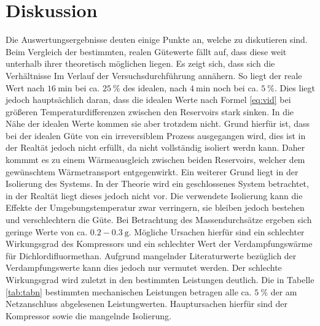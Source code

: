 
\section{Diskussion}
\label{sec:Diskussion}
Die Auswertungsergebnisse deuten einige Punkte an, welche zu diskutieren sind.
Beim Vergleich der bestimmten, realen Gütewerte fällt auf, dass diese weit
unterhalb ihrer theoretisch möglichen liegen. Es zeigt sich, dass sich die
Verhältnisse Im Verlauf der Versuchsdurchführung annähern. So liegt der reale
Wert nach $\SI{16}{\minute}$ bei ca. $\SI{25}{\percent}$ des idealen, nach
$\SI{4}{\minute}$ noch bei ca. $\SI{5}{\percent}$. Dies liegt jedoch
hauptsächlich daran, dass die idealen Werte nach Formel \ref{eq:vid} bei
größeren Temperaturdifferenzen zwischen den Reservoirs stark sinken. In die Nähe
der idealen Werte kommen sie aber trotzdem nicht. Grund hierfür ist, dass bei der
idealen Güte von ein irreversiblem Prozess ausgegangen wird, dies ist in der
Realtät jedoch nicht erfüllt, da nicht vollständig isoliert werdn kann. Daher kommmt es zu einem Wärmeausgleich zwischen
beiden Reservoirs, welcher dem gewünschtem Wärmetransport entgegenwirkt. Ein
weiterer Grund liegt in der Isolierung des Systems. In der Theorie wird
ein geschlossenes System betrachtet, in der Realtät liegt dieses jedoch nicht
vor. Die verwendete Isolierung kann die Effekte der Umgebungstemperatur zwar
verringern, sie bleiben jedoch bestehen und verschlechtern die Güte. Bei
Betrachtung des Massendurchsätze ergeben sich geringe Werte von ca.
$0.2-\SI{0.3}{\gram}$. Mögliche Ursachen hierfür sind ein schlechter Wirkungsgrad
des Kompressors und ein schlechter Wert der Verdampfungswärme für Dichlordifluormethan.
Aufgrund mangelnder Literaturwerte bezüglich der Verdampfungswerte kann dies
jedoch nur vermutet werden. Der schlechte Wirkungsgrad wird zuletzt in den
bestimmten Leistungen deutlich. Die in Tabelle \ref{tab:tabn} bestimmten mechanischen Leistungen betragen alle ca.
$\SI{5}{\percent}$ der am Netzanschluss abgelesenen Leistungwerten. Hauptursachen
 hierfür sind der Kompressor sowie die mangelnde Isolierung.
